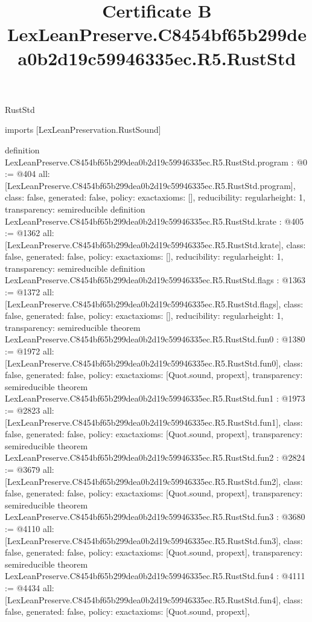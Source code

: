 \begin{lexlean}{RustStd}
\title{Certificate B LexLeanPreserve.C8454bf65b299dea0b2d19c59946335ec.R5.RustStd}
\begin{coremodule}
imports [LexLeanPreservation.RustSound]

definition LexLeanPreserve.C8454bf65b299dea0b2d19c59946335ec.R5.RustStd.program : @0 := @404 {
  all: [LexLeanPreserve.C8454bf65b299dea0b2d19c59946335ec.R5.RustStd.program],
  class: false,
  generated: false,
  policy: exact{axioms: []},
  reducibility: regular{height: 1},
  transparency: semireducible
}
definition LexLeanPreserve.C8454bf65b299dea0b2d19c59946335ec.R5.RustStd.krate : @405 := @1362 {
  all: [LexLeanPreserve.C8454bf65b299dea0b2d19c59946335ec.R5.RustStd.krate],
  class: false,
  generated: false,
  policy: exact{axioms: []},
  reducibility: regular{height: 1},
  transparency: semireducible
}
definition LexLeanPreserve.C8454bf65b299dea0b2d19c59946335ec.R5.RustStd.flags : @1363 := @1372 {
  all: [LexLeanPreserve.C8454bf65b299dea0b2d19c59946335ec.R5.RustStd.flags],
  class: false,
  generated: false,
  policy: exact{axioms: []},
  reducibility: regular{height: 1},
  transparency: semireducible
}
theorem LexLeanPreserve.C8454bf65b299dea0b2d19c59946335ec.R5.RustStd.fun0 : @1380 := @1972 {
  all: [LexLeanPreserve.C8454bf65b299dea0b2d19c59946335ec.R5.RustStd.fun0],
  class: false,
  generated: false,
  policy: exact{axioms: [Quot.sound, propext]},
  transparency: semireducible
}
theorem LexLeanPreserve.C8454bf65b299dea0b2d19c59946335ec.R5.RustStd.fun1 : @1973 := @2823 {
  all: [LexLeanPreserve.C8454bf65b299dea0b2d19c59946335ec.R5.RustStd.fun1],
  class: false,
  generated: false,
  policy: exact{axioms: [Quot.sound, propext]},
  transparency: semireducible
}
theorem LexLeanPreserve.C8454bf65b299dea0b2d19c59946335ec.R5.RustStd.fun2 : @2824 := @3679 {
  all: [LexLeanPreserve.C8454bf65b299dea0b2d19c59946335ec.R5.RustStd.fun2],
  class: false,
  generated: false,
  policy: exact{axioms: [Quot.sound, propext]},
  transparency: semireducible
}
theorem LexLeanPreserve.C8454bf65b299dea0b2d19c59946335ec.R5.RustStd.fun3 : @3680 := @4110 {
  all: [LexLeanPreserve.C8454bf65b299dea0b2d19c59946335ec.R5.RustStd.fun3],
  class: false,
  generated: false,
  policy: exact{axioms: [Quot.sound, propext]},
  transparency: semireducible
}
theorem LexLeanPreserve.C8454bf65b299dea0b2d19c59946335ec.R5.RustStd.fun4 : @4111 := @4434 {
  all: [LexLeanPreserve.C8454bf65b299dea0b2d19c59946335ec.R5.RustStd.fun4],
  class: false,
  generated: false,
  policy: exact{axioms: [Quot.sound, propext]},
}
\end{coremodule}
\end{lexlean}
